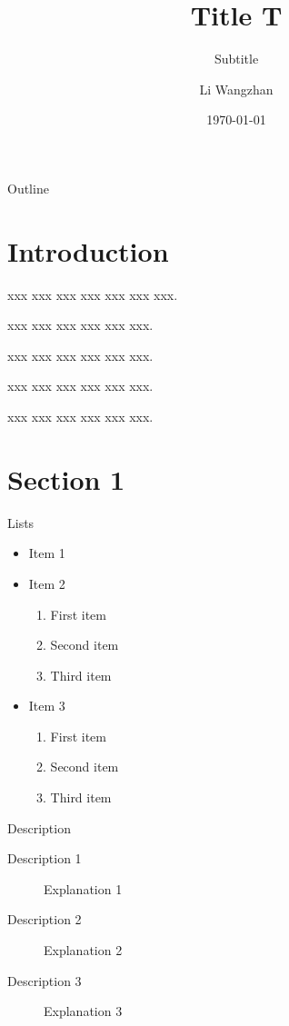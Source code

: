 \documentclass[compress,aspectratio=43]{beamer}
\title{Title T}
\subtitle{Subtitle}
\author{Li Wangzhan}
\date{\today}
\institute[XXXX]{University of XXXX}
\begin{document}
\begin{frame}[plain]
    \titlepage
\end{frame}

\begin{frame}{Outline}
    \tableofcontents[sectionstyle=show,subsectionstyle=show/shaded/hide,
        subsubsectionstyle=show/shaded/hide]
\end{frame}

\section{Introduction}

\begin{frame}
    xxx xxx xxx xxx xxx xxx xxx.

    xxx xxx xxx xxx xxx xxx.

    xxx xxx xxx xxx xxx xxx.

    xxx xxx xxx xxx xxx xxx.

    xxx xxx xxx xxx xxx xxx.
\end{frame}

\section{Section 1}

\begin{frame}{Lists}
    \begin{itemize}
        \item Item 1
        \item Item 2
              \begin{enumerate}
                  \item First item
                  \item Second item
                  \item Third item
              \end{enumerate}
        \item Item 3
              \begin{enumerate}
                  \item First item
                  \item Second item
                  \item Third item
              \end{enumerate}
    \end{itemize}
\end{frame}

\begin{frame}{Description}
    \begin{description}
        \item[Description 1] Explanation 1
        \item[Description 2] Explanation 2
        \item[Description 3] Explanation 3
    \end{description}
\end{frame}
\end{document}
